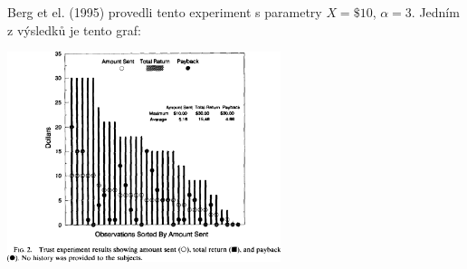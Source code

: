 \documentclass[a5paper,12pt]{article}
\begin{document}
      Berg et el. (1995) provedli tento experiment s parametry $X=\$10$, $\alpha=3$. Jedním z výsledků je tento graf:

      \begin{center}
        \includegraphics[width=0.6\textwidth]{berg.png}
      \end{center}
      
\end{document}
